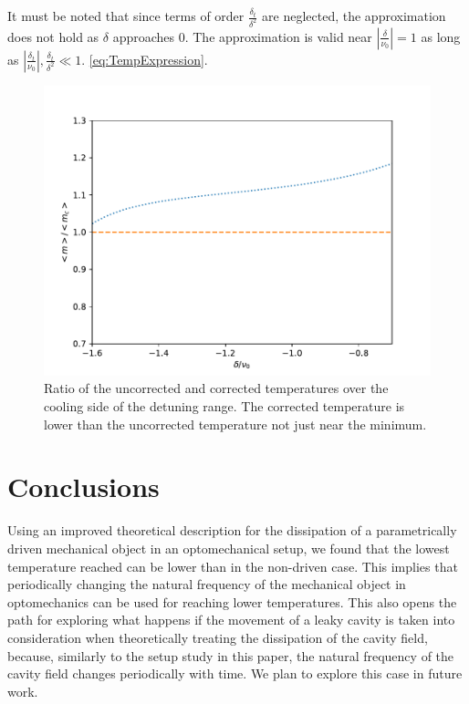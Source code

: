 \documentclass[reprint, amsmath,amssymb, aps,pra]{revtex4-1}
\begin{document}
It must be noted that since terms of order $\frac{\delta_t}{\delta^2}$
are neglected, the approximation does not hold as $\delta$ approaches
0. The approximation is valid near $|\frac{\delta}{\nu_0}| = 1$ as
long as $|\frac{\delta_t}{\nu_0}|,\frac{\delta_t}{\delta^2}\ll 1$. 
\eqref{eq:TempExpression}.

\begin{figure}
\includegraphics[scale=.5]{TempPropGorden1.pdf}
\caption{Ratio of the uncorrected and corrected temperatures over the cooling side of the detuning range. The corrected temperature is lower than the uncorrected temperature not just near the minimum.}
\label{fig:TempRatio}
\end{figure}




\section{Conclusions}\label{ConCl}

Using an improved theoretical description for the dissipation of a
parametrically driven mechanical object in an optomechanical setup, we
found that the lowest temperature reached can be lower than in the
non-driven case. This implies that periodically changing the natural
frequency of the mechanical object in optomechanics can be used for
reaching lower temperatures. This also opens the path for exploring
what happens if the movement of a leaky cavity is taken into
consideration when theoretically treating the dissipation of the
cavity field, because, similarly to the setup study in this paper, the
natural frequency of the cavity field changes periodically with time.
We plan to explore this case in future work.
 
\end{document}
